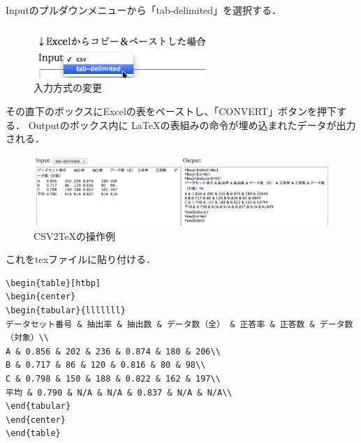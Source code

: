 Inputのプルダウンメニューから「tab-delimited」を選択する．
\begin{figure}[H]
\centering
\includegraphics[width=6.5cm]{inputTypeChange.png}
\caption{入力方式の変更}
\label{fig:inputTypeChange}
\end{figure}



その直下のボックスにExcelの表をペーストし、「CONVERT」ボタンを押下する．
Outputのボックス内に \LaTeX の表組みの命令が埋め込まれたデータが出力される．
\begin{figure}[htb]
\centering
\includegraphics[width=14cm]{convertTable.png}
\caption{CSV2TeXの操作例}
\label{fig:convertTable}
\end{figure}

これをtexファイルに貼り付ける．
\begin{breakbox}
{\small
\begin{verbatim}
\begin{table}[htbp]
\begin{center}
\begin{tabular}{lllllll}
データセット番号 & 抽出率 & 抽出数 & データ数（全） & 正答率 & 正答数 & データ数（対象）\\
A & 0.856 & 202 & 236 & 0.874 & 180 & 206\\
B & 0.717 & 86 & 120 & 0.816 & 80 & 98\\
C & 0.798 & 150 & 188 & 0.822 & 162 & 197\\
平均 & 0.790 & N/A & N/A & 0.837 & N/A & N/A\\
\end{tabular}
\end{center}
\end{table}
\end{verbatim}
}
\end{breakbox}

